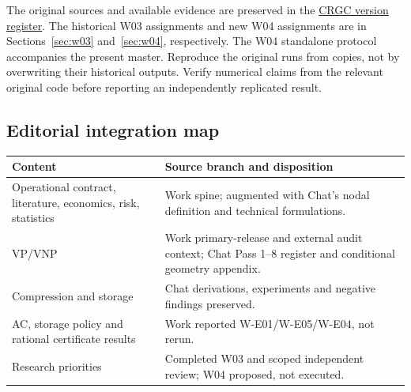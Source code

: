 \documentclass[11pt,letterpaper]{article}
\begin{document}
The original sources and available evidence are preserved in the \href{https://chatgpt.com/space/page_c22eca223fc88191a109ba88e518d954}{CRGC version register}. The historical W03 assignments and new W04 assignments are in Sections~\ref{sec:w03} and~\ref{sec:w04}, respectively. The W04 standalone protocol accompanies the present master. Reproduce the original runs from copies, not by overwriting their historical outputs. Verify numerical claims from the relevant original code before reporting an independently replicated result.

\subsection{Editorial integration map}
\begin{longtable}{P{.38\linewidth}P{.53\linewidth}}
\toprule Content & Source branch and disposition\\\midrule\endhead
Operational contract, literature, economics, risk, statistics & Work spine; augmented with Chat's nodal definition and technical formulations.\\
VP/VNP & Work primary-release and external audit context; Chat Pass 1--8 register and conditional geometry appendix.\\
Compression and storage & Chat derivations, experiments and negative findings preserved.\\
AC, storage policy and rational certificate results & Work reported W-E01/W-E05/W-E04, not rerun.\\
Research priorities & Completed W03 and scoped independent review; W04 proposed, not executed.\\
\bottomrule
\end{longtable}
\end{document}
